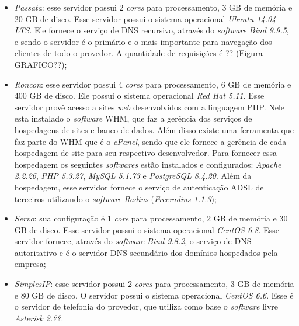 \begin{itemize}
 \item \textit{Passata}: esse servidor possui 2 \textit{cores} para processamento, 3 GB de memória e 20 GB de disco. Esse servidor possui o 
 sistema operacional \textit{Ubuntu 14.04 \ac{LTS}}. Ele fornece o serviço de \ac{DNS} recursivo, através do \textit{software} 
 \textit{Bind 9.9.5}, e sendo o servidor é o primário e o mais importante para navegação dos clientes de todo o provedor. A quantidade 
 de requisições é ?? (Figura GRAFICO??);
 
 \item \textit{Roncon}: esse servidor possui 4 \textit{cores} para processamento, 6 GB de memória e 400 GB de disco. Ele possui o sistema
 operacional \textit{Red Hat 5.11}. Esse servidor provê acesso a sites \textit{web} desenvolvidos com a linguagem \ac{PHP}. Nele esta instalado 
 o \textit{software} \ac{WHM}, que faz a gerência dos serviços de hospedagens de sites e banco de dados. Além disso existe uma ferramenta que 
 faz parte do \ac{WHM} que é o \textit{cPanel}, sendo que ele fornece a gerência de cada hospedagem de site para seu respectivo desenvolvedor.
 Para fornecer essa hospedagem os seguintes \textit{softwares} estão instalados e configurados: \textit{Apache 2.2.26}, \textit{\ac{PHP} 5.3.27}, 
 \textit{MySQL 5.1.73} e \textit{PostgreSQL 8.4.20}.
 Além da hospedagem, esse servidor fornece o serviço de autenticação \ac{ADSL} de terceiros utilizando o \textit{software} \textit{Radius} 
 (\textit{Freeradius 1.1.3});
 
 \item \textit{Servo}: sua configuração é 1 \textit{core} para processamento, 2 GB de memória e 30 GB de disco. Esse servidor possui o 
 sistema operacional \textit{CentOS 6.8}. Esse servidor fornece, através do \textit{software} \textit{Bind 9.8.2}, o serviço de \ac{DNS} 
 autoritativo e é o servidor \ac{DNS} secundário dos domínios hospedados pela empresa;
 
 \item \textit{SimplesIP}: esse servidor possui 2 \textit{cores} para processamento, 3 GB de memória e 80 GB de disco. O servidor possui 
 o sistema operacional \textit{CentOS 6.6}. Esse é o servidor de telefonia do provedor, que utiliza como base o \textit{software} livre 
 \textit{Asterisk 2.??}.
\end{itemize}

